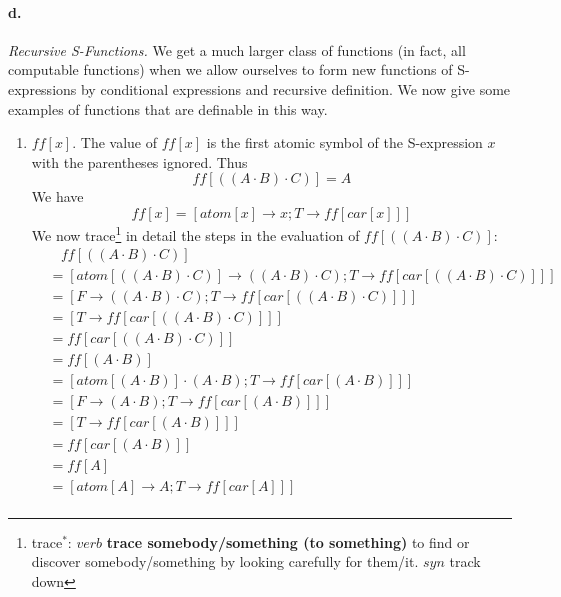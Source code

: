 \documentclass[11pt, a4paper]{article}
\begin{document}
\paragraph{d.}\textit{Recursive S-Functions.}
We get a much larger class of functions (in fact, all computable functions) when
we allow ourselves to form new functions of S-expressions by conditional
expressions and recursive definition. We now give some examples of functions
that are definable in this way.
\begin{enumerate}
\item $ff[x]$. The value of $ff[x]$ is the first atomic symbol of the
  S-expression $x$ with the parentheses ignored. Thus
  $$ ff[((A \cdot B) \cdot C)] = A $$
  We have
  $$ ff[x] = [atom[x] \to x; T \to ff[car[x]]] $$
  We now
  trace\footnote{trace$^*$: $verb$ \textbf{trace somebody/something (to
      something)} to find or discover somebody/something by looking carefully
    for them/it. $syn$ track down}
  in detail the steps in the evaluation of $ff[((A \cdot B) \cdot
    C)]$:
  \begin{align*}
    &\ \ \ \ ff[((A \cdot B) \cdot C)]                                     \\
    &= [atom[((A \cdot B) \cdot C)] \to ((A \cdot B) \cdot C); T \to ff[car[((A
          \cdot B) \cdot C)]]]                                             \\
    &= [F \to ((A \cdot B) \cdot C); T \to ff[car[((A \cdot B) \cdot C)]]] \\
    &= [T \to ff[car[((A \cdot B) \cdot C)]]]                              \\
    &= ff[car[((A \cdot B) \cdot C)]]                                      \\
    &= ff[(A \cdot B)]                                                     \\
    &= [atom[(A \cdot B)] \cdot (A \cdot B); T \to ff[car[(A \cdot B)]]]   \\
    &= [F \to (A \cdot B); T \to ff[car[(A \cdot B)]]]                     \\
    &= [T \to ff[car[(A \cdot B)]]]                                        \\
    &= ff[car[(A \cdot B)]]                                                \\
    &= ff[A]                                                               \\
    &= [atom[A] \to A; T \to ff[car[A]]]                                   \\

\end{align*}
\end{enumerate}
\end{document}
